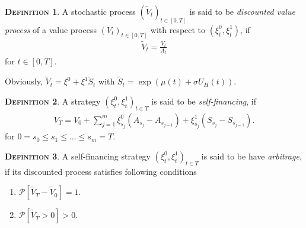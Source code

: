 \documentclass[a4paper, twoside, 11pt]{article}
\theoremstyle{definition}
\newtheorem{definition}{\scshape Definition}[section]
\begin{document}
\begin{definition}
  A stochastic process $(\tilde{V}_t)_{t\in[0,T]}$ is said to be \emph{discounted value process} of a value process $(V_t)_{t\in [0, T]}$ with respect to $(\xi_t^0, \xi_t^1)$, if 
  \begin{eqnarray*}
	\tilde{V}_t = \frac{V_t}{A_t}
  \end{eqnarray*}
  for $t \in [0, T]$.
\end{definition}
Obviously, $\tilde{V}_t = \xi^0 + \xi^1 \tilde{S}_t$ with $\tilde{S}_t=\exp(\mu(t) + \sigma U_H(t))$.
\begin{definition}
  A strategy $(\xi^0_t, \xi^1_t)_{t\in T}$ is said to be \emph{self-financing}, if
  \begin{eqnarray}
	V_T = V_0 + \sum_{j=1}^{m} \xi^0_{s_j} (A_{s_{j}} - A_{s_{j-1}}) + \xi^1_{s_j} (S_{s_{j}} - S_{s_{j-1}}). 
	\label{sec:123}
  \end{eqnarray}
  \label{sec:def}
  for $0=s_0\le s_1\le \dots\le s_m=T$.
\end{definition}

\begin{definition}
  A self-financing strategy $(\xi^0_t, \xi^1_t)_{t\in T}$ is said to be have \emph{arbitrage}, if its discounted process satisfies following conditions
  \begin{enumerate}[topsep=0pt, itemsep=-1ex, partopsep=1ex, parsep=1ex, label=(\roman*)]
	\item $\mathcal{P}[\tilde{V}_T - \tilde{V}_0]=1$.
	\item $\mathcal{P}[\tilde{V}_T > 0] > 0$.
	\end{enumerate}
  \end{definition}
\end{document}
